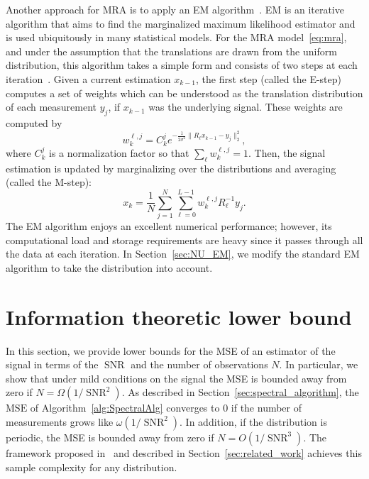\documentclass{IEEEtran}
\numberwithin{equation}{section}
\numberwithin{figure}{section}
\theoremstyle{plain}
\theoremstyle{definition}
\theoremstyle{remark}
\theoremstyle{plain}
\theoremstyle{remark}
\theoremstyle{plain}
\theoremstyle{plain}
\theoremstyle{remark}
\newcommand{\SNR}{\operatorname{SNR}}
\newcommand{\MSE}{\mathrm{MSE}}
\newcommand{\OO}{{O}}
\begin{document}
Another approach for MRA is to apply an EM algorithm~\cite{dempster1977maximum}. EM is an iterative algorithm that aims to find the marginalized maximum likelihood estimator and is used ubiquitously in many statistical models. 
For the MRA model~\eqref{eq:mra}, and under the assumption that the translations are drawn from the uniform distribution, this algorithm takes a simple form and consists of two steps at each iteration~\cite{bendory2017bispectrum}. Given a current estimation $x_{k-1}$, the first step (called the E-step) computes a set of weights which can be understood as the translation distribution of each measurement $y_j$, if $x_{k-1}$ was the underlying signal. These weights are computed by 
\begin{equation*}
w_k^{\ell,j} = C_k^{j} e^{-\frac{1}{2\sigma^2}\| R_\ell x_{k-1}-y_j \|_2^2 },
\end{equation*}  
where $C_k^{j}$ is a normalization factor so that $\sum_{\ell} w_k^{\ell,j} = 1$. Then, the signal estimation is updated by marginalizing over the distributions and averaging (called the M-step):  
\begin{equation} \label{eq:standard_EM}
x_k = \frac{1}{N} \sum_{j=1}^{N}\sum_{\ell=0}^{L-1} w_k^{\ell,j}R_\ell^{-1}y_j.
\end{equation}
The EM algorithm enjoys an excellent numerical performance; however, its computational load and storage requirements are heavy since it passes through all the data at each iteration. In Section~\ref{sec:NU_EM}, we modify the standard EM algorithm to take the distribution into account.

\section{Information theoretic lower bound} \label{sec:information_limit}

In this section, we provide lower bounds for the MSE of an estimator of the signal in terms of the $\SNR$ and the number of observations $N$. In particular, we show that under mild conditions on the signal the MSE is bounded away from zero if $N=\Omega(1/\SNR^2)$. As described in Section~\ref{sec:spectral_algorithm}, the $\MSE$ of Algorithm~\ref{alg:SpectralAlg} converges to $0$ if the number of measurements grows like $\omega(1/\SNR^2)$. In addition, if the distribution is periodic, the MSE is bounded away from zero if $N=\OO(1/\SNR^3)$. The framework proposed in~\cite{bendory2017bispectrum} and described in Section~\ref{sec:related_work} achieves this sample complexity for any distribution.
\end{document}
